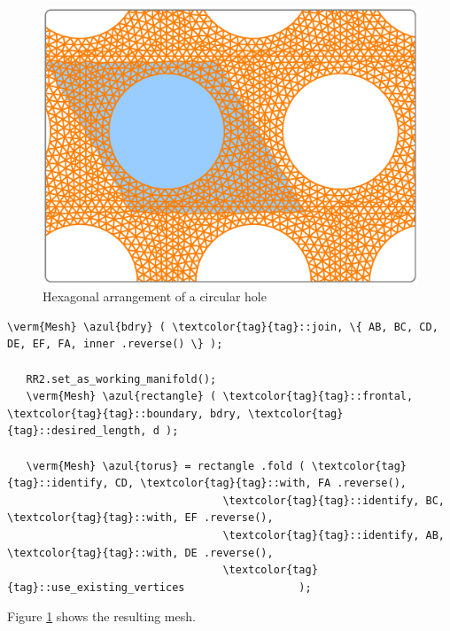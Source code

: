 \begin{figure}[ht] \centering
  \includegraphics[width=115mm]{hexa-round-hole.eps}
  \caption{Hexagonal arrangement of a circular hole}
  \label{\numb section 7.\numb fig 18}
\end{figure}

\begin{Verbatim}[commandchars=\\\{\},formatcom=\small\tt,frame=single,
   label=parag-\ref{\numb section 7.\numb parag 22}.cpp,rulecolor=\color{moldura},
   baselinestretch=0.94,framesep=2mm                                             ]
   \verm{Mesh} \azul{bdry} ( \textcolor{tag}{tag}::join, \{ AB, BC, CD, DE, EF, FA, inner .reverse() \} );

   RR2.set_as_working_manifold();
   \verm{Mesh} \azul{rectangle} ( \textcolor{tag}{tag}::frontal, \textcolor{tag}{tag}::boundary, bdry, \textcolor{tag}{tag}::desired_length, d );

   \verm{Mesh} \azul{torus} = rectangle .fold ( \textcolor{tag}{tag}::identify, CD, \textcolor{tag}{tag}::with, FA .reverse(),
                                  \textcolor{tag}{tag}::identify, BC, \textcolor{tag}{tag}::with, EF .reverse(),
                                  \textcolor{tag}{tag}::identify, AB, \textcolor{tag}{tag}::with, DE .reverse(),
                                  \textcolor{tag}{tag}::use_existing_vertices                  );
\end{Verbatim}

Figure \ref{\numb section 7.\numb fig 18} shows the resulting mesh.
\vfil\eject


